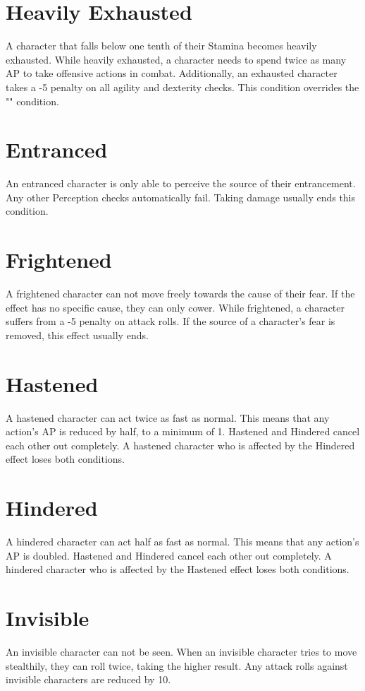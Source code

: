 \section{Heavily Exhausted}\label{condition:heavilyExhausted}
A character that falls below one tenth of their Stamina becomes heavily exhausted.
While heavily exhausted, a character needs to spend twice as many AP to take offensive actions in combat.
Additionally, an exhausted character takes a -5 penalty on all agility and dexterity checks.
This condition overrides the "" condition.

\section{Entranced}\label{condition:entranced}
An entranced character is only able to perceive the source of their entrancement.
Any other Perception checks automatically fail.
Taking damage usually ends this condition.

\section{Frightened}\label{condition:frightened}
A frightened character can not move freely towards the cause of their fear.
If the effect has no specific cause, they can only cower.
While frightened, a character suffers from a -5 penalty on attack rolls.
If the source of a character's fear is removed, this effect usually ends.

\section{Hastened}\label{condition:hastened}
A hastened character can act twice as fast as normal.
This means that any action's AP is reduced by half, to a minimum of 1.
Hastened and Hindered cancel each other out completely.
A hastened character who is affected by the Hindered effect loses both conditions.

\section{Hindered}\label{condition:hindered}
A hindered character can act half as fast as normal.
This means that any action's AP is doubled.
Hastened and Hindered cancel each other out completely.
A hindered character who is affected by the Hastened effect loses both conditions.

\section{Invisible}\label{condition:invisible}
An invisible character can not be seen.
When an invisible character tries to move stealthily, they can roll twice, taking the higher result.
Any attack rolls against invisible characters are reduced by 10.

